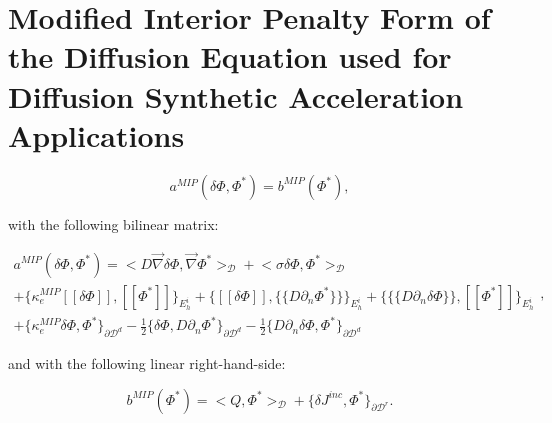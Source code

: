 \section{Modified Interior Penalty Form of the Diffusion Equation used for Diffusion Synthetic Acceleration Applications}
\label{sec::DSA_MIP}

\begin{equation}
a^{MIP}( \delta \Phi, \Phi^*) = b^{MIP}(\Phi^*),
\label{eq::MIP_weak_form}
\end{equation}

\noindent with the following bilinear matrix:

\begin{equation}
\label{eq::MIP_bilinear_form}
\begin{aligned}
a^{MIP}(\delta \Phi, \Phi^*)  = \Big<  D \vec{\nabla} \delta  \Phi , \vec{\nabla} \Phi^*  \Big>_{\mathcal{D}} + \Big<  \sigma \delta  \Phi ,  \Phi^*  \Big>_{\mathcal{D}}    \\
+  \Big\{ \kappa_e^{MIP} [\![ \delta  \Phi ]\!] , [\![  \Phi^* ]\!]\Big\}_{E_h^i} + \Big\{  [\![  \delta \Phi ]\!] , \{\!\{  D \partial_n \Phi^* \}\!\}\Big\}_{E_h^i}  + \Big\{ \{\!\{  D \partial_n \delta \Phi \}\!\} , [\![ \Phi^* ]\!]\Big\}_{E_h^i} \\
+ \Big\{ \kappa_e^{MIP}  \delta \Phi ,   \Phi^* \Big\}_{\partial \mathcal{D}^d} - \frac{1}{2} \Big\{  \delta \Phi  ,  D \partial_n \Phi^* \Big\}_{\partial \mathcal{D}^d} - \frac{1}{2} \Big\{   D \partial_n \delta  \Phi , \Phi^* \Big\}_{\partial \mathcal{D}^d}  
\end{aligned} ,
\end{equation}

\noindent and with the following linear right-hand-side:

\begin{equation}
\label{eq::MIP_linear_form}
b^{MIP} (\Phi^*) = \Big<  Q, \Phi^*  \Big>_{\mathcal{D}}  + \Big\{ \delta  J^{inc}, \Phi^*  \Big\}_{\partial \mathcal{D}^r} .
\end{equation}



